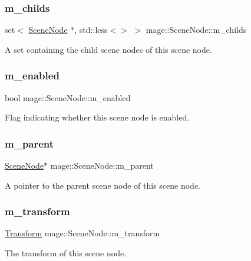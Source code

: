 \subsubsection{\texorpdfstring{m\+\_\+childs}{m\_childs}}
{\footnotesize\ttfamily set$<$ \hyperlink{classmage_1_1_scene_node}{Scene\+Node} $\ast$, std\+::less$<$$>$ $>$ mage\+::\+Scene\+Node\+::m\+\_\+childs\hspace{0.3cm}{\ttfamily [private]}}

A set containing the child scene nodes of this scene node. \hypertarget{classmage_1_1_scene_node_a886a097067e1aa22b7803aaf2f5ccbf0}{}\label{classmage_1_1_scene_node_a886a097067e1aa22b7803aaf2f5ccbf0} 
\subsubsection{\texorpdfstring{m\+\_\+enabled}{m\_enabled}}
{\footnotesize\ttfamily bool mage\+::\+Scene\+Node\+::m\+\_\+enabled\hspace{0.3cm}{\ttfamily [private]}}

Flag indicating whether this scene node is enabled. \hypertarget{classmage_1_1_scene_node_a507db45672f28f899f6c7b0f6a292202}{}\label{classmage_1_1_scene_node_a507db45672f28f899f6c7b0f6a292202} 
\subsubsection{\texorpdfstring{m\+\_\+parent}{m\_parent}}
{\footnotesize\ttfamily \hyperlink{classmage_1_1_scene_node}{Scene\+Node}$\ast$ mage\+::\+Scene\+Node\+::m\+\_\+parent\hspace{0.3cm}{\ttfamily [private]}}

A pointer to the parent scene node of this scene node. \hypertarget{classmage_1_1_scene_node_af1384e71b5cc527df881c7272e9fa518}{}\label{classmage_1_1_scene_node_af1384e71b5cc527df881c7272e9fa518} 
\subsubsection{\texorpdfstring{m\+\_\+transform}{m\_transform}}
{\footnotesize\ttfamily \hyperlink{structmage_1_1_transform}{Transform} mage\+::\+Scene\+Node\+::m\+\_\+transform\hspace{0.3cm}{\ttfamily [private]}}

The transform of this scene node. 